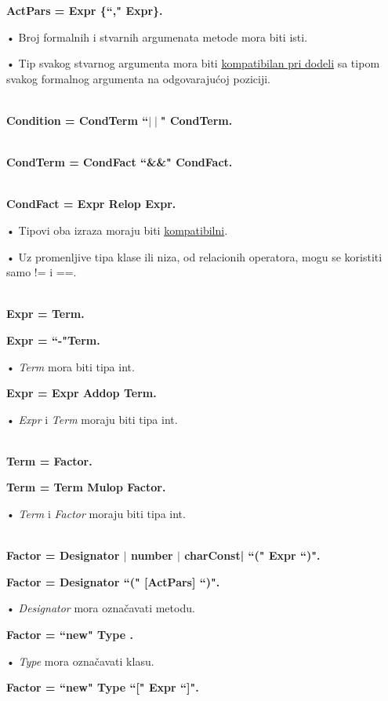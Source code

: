 \textbf{ActPars = Expr \{``," Expr\}. }

• Broj formalnih i stvarnih argumenata metode mora biti isti. 

• Tip svakog stvarnog argumenta mora biti \underline{kompatibilan pri dodeli} sa tipom svakog formalnog 
argumenta na odgovarajućoj poziciji. 

\hRule \\[0.2cm]

\textbf{Condition = CondTerm {``$\mid\mid$"{} CondTerm}.} 

\hRule \\[0.2cm]

\textbf{CondTerm = CondFact {``\&\&"{} CondFact}.} 

\hRule \\[0.2cm]
 
\textbf{CondFact = Expr Relop Expr.} 

• Tipovi oba izraza moraju biti \underline{kompatibilni}.
 
• Uz promenljive tipa klase ili niza, od relacionih operatora, mogu se koristiti samo != i ==. 

\hRule \\[0.2cm]
 
\textbf{Expr = Term.} 
 
\textbf{Expr = ``-"Term.}

• \textit{Term} mora biti tipa int. 
 
\textbf{Expr = Expr Addop Term.}

• \textit{Expr} i \textit{Term} moraju biti tipa int. 

\hRule \\[0.2cm]

\textbf{Term = Factor.} 
 
\textbf{Term = Term Mulop Factor.}

• \textit{Term} i \textit{Factor} moraju biti tipa int. 
 
\hRule \\[0.2cm]
 
\textbf{Factor = Designator $\mid$ number $\mid$ charConst| ``(" Expr ``)".} 
 
\textbf{Factor = Designator ``(" [ActPars] ``)".}

• \textit{Designator} mora označavati metodu. 
 
\textbf{Factor = ``new" Type .}

• \textit{Type} mora označavati klasu. 
 
\textbf{Factor = ``new" Type ``[" Expr ``]".}

